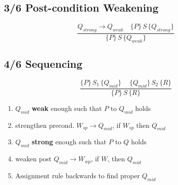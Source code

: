 \subsection*{3/6 Post-condition Weakening}
\begin{displaymath}
  \frac{Q_{strong}\rightarrow Q_{weak} \quad \{P\}\,S\,\{Q_{strong}\} } {\{P\}\,S\,\{Q_{weak}\}}
\end{displaymath}

\subsection*{4/6 Sequencing}
\begin{displaymath}
  \frac{\{P\}\,S_{1}\,\{ Q_{mid}\}\ \quad \{Q_{mid}\}\,S_{2}\,\{R\}}{\{P\}\,S\,\{R\}}
\end{displaymath}
\begin{enumerate}
\item $Q_{mid}$ \textbf{weak} enough such that $P$ to $Q_{mid}$ holds
\item[] strengthen precond. $W_{sp} \rightarrow Q_{mid}$, if $W_{sp}$ then $Q_{mid}$
\item $Q_{mid}$ \textbf{strong} enough such that $P$ to $Q$ holds
\item[] weaken post $Q_{mid} \rightarrow W_{wp}$, if $W$, then $Q_{mid}$
\item Assignment rule backwards to find proper $Q_{mid}$
\end{enumerate}
%
%

